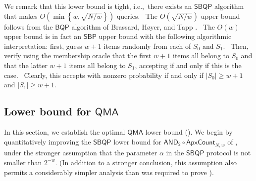 \documentclass[10pt,a4paper]{article}
\newcommand{\<}{\langle}
\renewcommand{\>}{\rangle}
\newcommand{\AndApxCount}{\mathsf{AND}_2\circ\mathsf{ApxCount}_{N,w}}
\begin{document}
We remark that this lower bound is tight, i.e.,\ there exists an $\mathsf{
SBQP}$ algorithm that makes $O\left( \min \left\{ w,\sqrt{N/w}\right\}
\right) $ queries. \ The $O(\sqrt{N/w})$ upper bound follows from the $
\mathsf{BQP}$ algorithm of Brassard, H{\o }yer, and Tapp \cite{bht:count}. \
The $O(w)$ upper bound is in fact an $\mathsf{SBP}$ upper bound with the
following algorithmic interpretation: first, guess $w+1$ items randomly from
each of $S_{0}$ and $S_{1}$. \ Then, verify using the membership oracle that
the first $w+1$ items all belong to $S_{0}$ and that the latter $w+1$ items
all belong to $S_{1}$, accepting if and only if this is the case. \ Clearly,
this accepts with nonzero probability if and only if $\left\vert
S_{0}\right\vert \geq w+1$ and $\left\vert S_{1}\right\vert \geq w+1$. 

%
\subsection{Lower bound for \texorpdfstring{$\mathsf{QMA}$}{QMA}}
\label{sec:QMA} 

In this section, we establish the optimal $\mathsf{QMA}$ lower bound 
(\Cref{thm:qmabound}).
We begin by quantitatively improving the $\mathsf{SBQP}$
lower bound for $\AndApxCount$ of ,
under the stronger assumption that the parameter $\alpha$ 
in the $\mathsf{SBQP}$ protocol is not smaller than $2^{-w}$.
(In addition to a stronger
conclusion, this assumption also permits a considerably simpler
analysis than was required to prove ).
\end{document}
